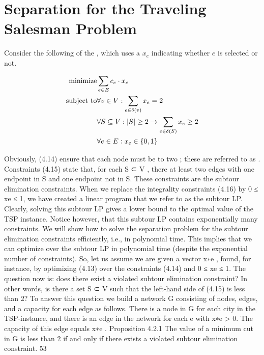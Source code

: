 \section{Separation for the Traveling Salesman Problem}
Consider the following  of the , which uses a  $x_e$ indicating whether  $e$ is selected or not.

\begin{eqnarray}
\mbox{minimize}&\sumdomain[e]{E}{c_e\cdot x_e}\\
\mbox{subject to}&\forall v\in V:\sumdomain[e]{\fun{\delta}{v}}x_e=2\\
&\forall S\subseteq V:\abs{S}\geq2\rightarrow\sumdomain[e]{\fun{\delta}{S}}x_e\geq 2\\
&\forall e\in E:x_e\in\accl{0,1}
\end{eqnarray}

Obviously,  (4.14) ensure that each node must be  to two ; these  are referred to as . Constraints (4.15) state that, for each  S ⊂ V , there at least two
edges with one endpoint in S and one endpoint not in S. These constraints are the subtour elimination
constraints.
When we replace the integrality constraints (4.16) by 0 ≤ xe ≤ 1, we have created a linear program that
we refer to as the subtour LP. Clearly, solving this subtour LP gives a lower bound to the optimal value
of the TSP instance. Notice however, that this subtour LP contains exponentially many constraints. We
will show how to solve the separation problem for the subtour elimination constraints efficiently, i.e., in
polynomial time. This implies that we can optimize over the subtour LP in polynomial time (despite the
exponential number of constraints).
So, let us assume we are given a vector x∗e , found, for instance, by optimizing (4.13) over the constraints
(4.14) and 0 ≤ xe ≤ 1. The question now is: does there exist a violated subtour elimination constraint?
In other words, is there a set S ⊂ V such that the left-hand side of (4.15) is less than 2? To answer this
question we build a network G consisting of nodes, edges, and a capacity for each edge as follows. There
is a node in G for each city in the TSP-instance, and there is an edge in the network for each e with
x∗e > 0. The capacity of this edge equals x∗e .
Proposition 4.2.1 The value of a minimum cut in G is less than 2 if and only if there exists a violated
subtour elimination constraint.
53

